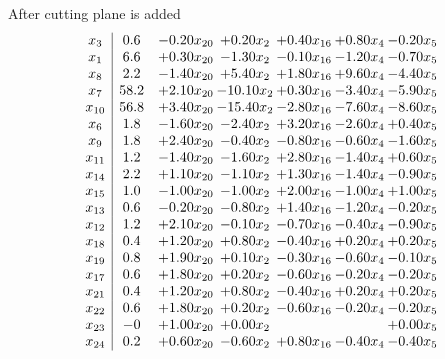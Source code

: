\documentclass[8pt]{article}
\begin{document}
 After cutting plane is added 
\[\begin{array}{c| c c@{\hskip 2pt} c@{\hskip 2pt} c@{\hskip 2pt} c@{\hskip 2pt} c@{\hskip 2pt} }
 x_{3}   &  0.6 & -0.20 x_{20} & +  0.20 x_{2} & +  0.40 x_{16} & +  0.80 x_{4} & -0.20 x_{5}\\
 x_{1}   &  6.6 & +  0.30 x_{20} & -1.30 x_{2} & -0.10 x_{16} & -1.20 x_{4} & -0.70 x_{5}\\
 x_{8}   &  2.2 & -1.40 x_{20} & +  5.40 x_{2} & +  1.80 x_{16} & +  9.60 x_{4} & -4.40 x_{5}\\
 x_{7}   &  58.2 & +  2.10 x_{20} & -10.10 x_{2} & +  0.30 x_{16} & -3.40 x_{4} & -5.90 x_{5}\\
 x_{10}   &  56.8 & +  3.40 x_{20} & -15.40 x_{2} & -2.80 x_{16} & -7.60 x_{4} & -8.60 x_{5}\\
 x_{6}   &  1.8 & -1.60 x_{20} & -2.40 x_{2} & +  3.20 x_{16} & -2.60 x_{4} & +  0.40 x_{5}\\
 x_{9}   &  1.8 & +  2.40 x_{20} & -0.40 x_{2} & -0.80 x_{16} & -0.60 x_{4} & -1.60 x_{5}\\
 x_{11}   &  1.2 & -1.40 x_{20} & -1.60 x_{2} & +  2.80 x_{16} & -1.40 x_{4} & +  0.60 x_{5}\\
 x_{14}   &  2.2 & +  1.10 x_{20} & -1.10 x_{2} & +  1.30 x_{16} & -1.40 x_{4} & -0.90 x_{5}\\
 x_{15}   &  1.0 & -1.00 x_{20} & -1.00 x_{2} & +  2.00 x_{16} & -1.00 x_{4} & +  1.00 x_{5}\\
 x_{13}   &  0.6 & -0.20 x_{20} & -0.80 x_{2} & +  1.40 x_{16} & -1.20 x_{4} & -0.20 x_{5}\\
 x_{12}   &  1.2 & +  2.10 x_{20} & -0.10 x_{2} & -0.70 x_{16} & -0.40 x_{4} & -0.90 x_{5}\\
 x_{18}   &  0.4 & +  1.20 x_{20} & +  0.80 x_{2} & -0.40 x_{16} & +  0.20 x_{4} & +  0.20 x_{5}\\
 x_{19}   &  0.8 & +  1.90 x_{20} & +  0.10 x_{2} & -0.30 x_{16} & -0.60 x_{4} & -0.10 x_{5}\\
 x_{17}   &  0.6 & +  1.80 x_{20} & +  0.20 x_{2} & -0.60 x_{16} & -0.20 x_{4} & -0.20 x_{5}\\
 x_{21}   &  0.4 & +  1.20 x_{20} & +  0.80 x_{2} & -0.40 x_{16} & +  0.20 x_{4} & +  0.20 x_{5}\\
 x_{22}   &  0.6 & +  1.80 x_{20} & +  0.20 x_{2} & -0.60 x_{16} & -0.20 x_{4} & -0.20 x_{5}\\
 x_{23}   &  -0 & +  1.00 x_{20} & +  0.00 x_{2} &    &   & +  0.00 x_{5}\\
 x_{24}   &  0.2 & +  0.60 x_{20} & -0.60 x_{2} & +  0.80 x_{16} & -0.40 x_{4} & -0.40 x_{5}\\

\end{array}\]
\end{document}
